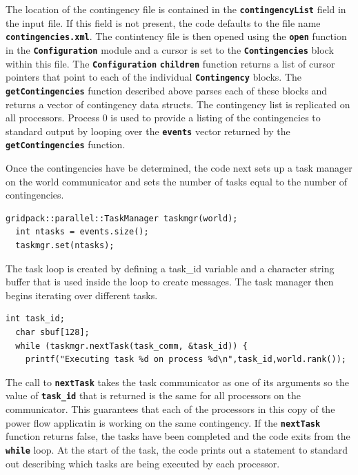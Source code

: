 \documentclass[12pt]{report} %
\begin{document}
The location of the contingency file is contained in the \texttt{\textbf{contingencyList}} field in the input file. If this field is not present, the code defaults to the file name \texttt{\textbf{contingencies.xml}}. The contintency file is then opened using the \texttt{\textbf{open}} function in the \texttt{\textbf{Configuration}} module and a cursor is set to the \texttt{\textbf{Contingencies}} block within this file. The \texttt{\textbf{Configuration}} \texttt{\textbf{children}} function returns a list of cursor pointers that point to each of the individual \texttt{\textbf{Contingency}} blocks. The \texttt{\textbf{getContingencies}} function described above parses each of these blocks and returns a vector of contingency data structs. The contingency list is replicated on all processors. Process 0 is used to provide a listing of the contingencies to standard output by looping over the \texttt{\textbf{events}} vector returned by the \texttt{\textbf{getContingencies}} function.

Once the contingencies have be determined, the code next sets up a task manager on the world communicator and sets the number of tasks equal to the number of contingencies.

{
\color{red}
\begin{Verbatim}[fontseries=b]
  gridpack::parallel::TaskManager taskmgr(world);
  int ntasks = events.size();
  taskmgr.set(ntasks);
\end{Verbatim}
}

The task loop is created by defining a task\_id variable and a character string buffer that is used inside the loop to create messages. The task manager then begins iterating over different tasks.

{
\color{red}
\begin{Verbatim}[fontseries=b]
  int task_id;
  char sbuf[128];
  while (taskmgr.nextTask(task_comm, &task_id)) {
    printf("Executing task %d on process %d\n",task_id,world.rank());
\end{Verbatim}
}

The call to \texttt{\textbf{nextTask}} takes the task communicator as one of its arguments so the value of \texttt{\textbf{task\_id}} that is returned is the same for all processors on the communicator. This guarantees that each of the processors in this copy of the power flow applicatin is working on the same contingency. If the \texttt{\textbf{nextTask}} function returns false, the tasks have been completed and the code exits from the \texttt{\textbf{while}} loop. At the start of the task, the code prints out a statement to standard out describing which tasks are being executed by each processor.
\end{document}
